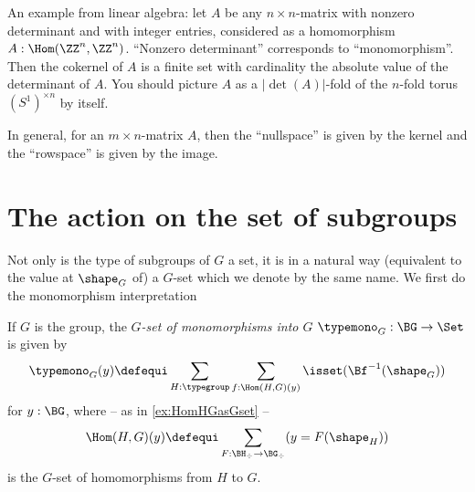 
\begin{example}
  An example from linear algebra: let $A$ be any $n\times n$-matrix with nonzero determinant and with integer entries, considered as a homomorphism $A:\Hom(\ZZ^n,\ZZ^n)$. ``Nonzero determinant'' corresponds to ``monomorphism''.  Then the cokernel of $A$ is a finite set with cardinality the absolute value of the determinant of $A$.  You should picture $A$ as a $|\det(A)|$-fold \covering of the $n$-fold torus $(S^1)^{\times n}$ by itself.

  In general, for an $m\times n$-matrix $A$, then the ``nullspace'' is given by the kernel and the ``rowspace'' is given by the image.
\end{example}


\section{The action on the set of subgroups}
\label{sec:actiononsub}

Not only is the type of subgroups  of $G$ a set, it is in a natural way (equivalent to the value at $\shape_G$ of) a $G$-set which we denote by the same name.  We first do the monomorphism interpretation
\begin{definition}
  If $G$ is the group, the \emph{$G$-set of monomorphisms into $G$} $\typemono_G:\BG\to\Set$ is given by
  $$%
  \typemono_G(y)\defequi \sum_{H:\typegroup}\sum_{f:\Hom(H,G)(y)}\isset(\Bf^{-1}(\shape_G))$$
  for $y:\BG$,
where  -- as in \cref{ex:HomHGasGset} --
$$\Hom(H,G)(y)\defequi\sum_{F:\BH_\div\to \BG_\div}(y=F(\shape_H))$$
is the $G$-set of homomorphisms from $H$ to $G$.
\end{definition}

